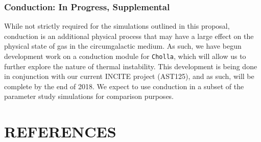 \documentclass[11pt,letterpaper,english]{article}
\begin{document}
\vspace{-.2in}
\subsubsection{Conduction: In Progress, Supplemental}
\vspace{-.25in}

While not strictly required for the simulations outlined in this proposal, conduction is an additional physical process that may have a large effect on the physical state of gas in the circumgalactic medium. As such, we have begun development work on a conduction module for {\tt Cholla}, which will allow us to further explore the nature of thermal instability. This development is being done in conjunction with our current INCITE project (AST125), and as such, will be complete by the end of 2018. We expect to use conduction in a subset of the parameter study simulations for comparison purposes.

\vspace{-.3in}
\section{REFERENCES}
\vspace{-.3in}

\vspace{-.15in}
\end{document}
